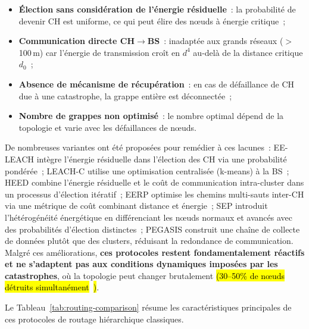 \begin{itemize}
    \item \textbf{Élection sans considération de l'énergie résiduelle}~: la probabilité de devenir CH est uniforme, ce qui peut élire des n\oe{}uds à énergie critique~;
    \item \textbf{Communication directe CH$\to$BS}~: inadaptée aux grands réseaux ($>$100\,m) car l'énergie de transmission croît en $d^4$ au-delà de la distance critique $d_0$~;
    \item \textbf{Absence de mécanisme de récupération}~: en cas de défaillance de CH due à une catastrophe, la grappe entière est déconnectée~;
    \item \textbf{Nombre de grappes non optimisé}~: le nombre optimal dépend de la topologie et varie avec les défaillances de n\oe{}uds.
\end{itemize}

De nombreuses variantes ont été proposées pour remédier à ces lacunes~: EE-LEACH \cite{kumar2012eeleach} intègre l'énergie résiduelle dans l'élection des CH via une probabilité pondérée~; LEACH-C \cite{heinzelman2002leach} utilise une optimisation centralisée (k-means) à la BS~; HEED \cite{younis2004heed} combine l'énergie résiduelle et le coût de communication intra-cluster dans un processus d'élection itératif~; EERP \cite{sha2013eerp} optimise les chemins multi-sauts inter-CH via une métrique de coût combinant distance et énergie~; SEP \cite{smaragdakis2004sep} introduit l'hétérogénéité énergétique en différenciant les n\oe{}uds normaux et avancés avec des probabilités d'élection distinctes~; PEGASIS \cite{lindsey2002pegasis} construit une chaîne de collecte de données plutôt que des clusters, réduisant la redondance de communication. Malgré ces améliorations, \textbf{ces protocoles restent fondamentalement réactifs et ne s'adaptent pas aux conditions dynamiques imposées par les catastrophes}, où la topologie peut changer brutalement \hl{(30--50\% de n\oe{}uds détruits simultanément}~\cite{AbuGhazaleh2007WSNSurvivability}\hl{)}.

Le Tableau~\ref{tab:routing-comparison} résume les caractéristiques principales de ces protocoles de routage hiérarchique classiques.

